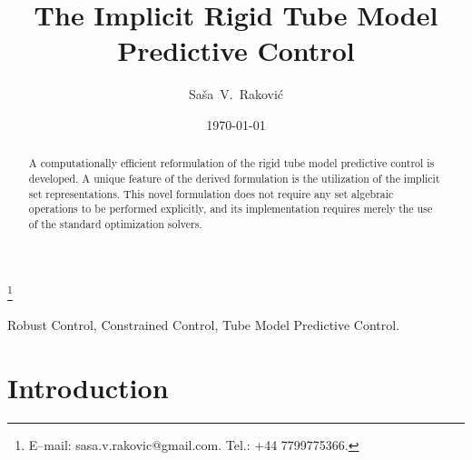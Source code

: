 \documentclass[twocolumn]{autart}
\date{\today}
\numberwithin{equation}{section}
\begin{document}
\begin{frontmatter}
  \title{The Implicit Rigid Tube Model Predictive Control}
  \author[svr]{Sa\v{s}a~V.~Rakovi\'{c}}  
	\address[svr]{Beijing Institute of Technology, Beijing, China.}
  \thanks[corr]{E--mail: sasa.v.rakovic@gmail.com. Tel.: +44 7799775366.}
\begin{abstract}
A computationally efficient reformulation of the rigid tube model predictive control is developed. A unique feature of the derived formulation is the utilization of the implicit set representations. This novel formulation does not require any set algebraic operations to be performed explicitly, and its implementation requires merely the use of the standard optimization solvers.  
\end{abstract}
\begin{keyword}
Robust Control, Constrained Control, Tube Model Predictive Control.
\end{keyword}
\end{frontmatter}
\section{Introduction}
\label{sec:01}
\end{document}

